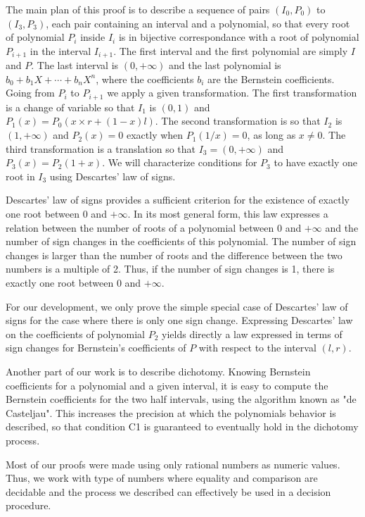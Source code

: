 \documentclass{mscs}
\begin{document}
The main plan of this proof is to describe a sequence of pairs
\((I_0, P_0)\) to \((I_3, P_3)\), each pair containing an interval
and a polynomial, so that every root of polynomial \(P_i\) inside
\(I_i\) is in bijective correspondance with a root of polynomial \(P_{i+1}\)
in the interval \(I_{i+1}\).  The first interval and the first polynomial
are simply \(I\) and \(P\).  The last interval is \((0, +\infty)\) and
the last polynomial is \(b_0 + b_1 X + \cdots + b_n X^n\), where
the coefficients \(b_i\) are the Bernstein coefficients.  Going from
\(P_i\) to \(P_{i+1}\) we apply a given transformation.  The first 
transformation is a change of variable so that \(I_1\) is \((0,1)\) and
\(P_1(x) = P_0(x \times r + (1 - x) l)\).  The second transformation is so
that \(I_2\) is \((1,+\infty)\) and \(P_2(x) = 0\) exactly when
\(P_1(1/x) = 0\), as long as \(x\neq 0\).  The third transformation is a
translation so that \(I_3 = (0,+\infty)\) and \(P_3(x) = P_2(1+x)\).  
We will characterize conditions for \(P_3\) to have exactly one root in
\(I_3\) using Descartes' law of signs.

Descartes' law of signs provides a sufficient criterion for the
existence of exactly one root between 0 and \(+\infty\).  In its
most general form, this law
expresses a relation between the number of roots of a polynomial
between 0 and \(+\infty\) and the number of sign changes in the
coefficients of this polynomial.  The number of sign changes is larger
than the number of roots and the difference between the two numbers is
a multiple of 2.  Thus, if the number of sign changes is 1, there is
exactly one root between 0 and \(+\infty\).

For our development, we only prove the simple special case of
Descartes' law of signs for the case where there is only one sign
change.  Expressing Descartes' law on the coefficients of polynomial
\(P_2\) yields directly a law expressed in terms of sign changes for
Bernstein's coefficients of \(P\) with respect to the interval
\((l,r)\).

Another part of our work is to describe dichotomy.  Knowing Bernstein
coefficients for a polynomial and a given interval, it is easy to
compute the Bernstein coefficients for the two half intervals, using
the algorithm known as "de Casteljau".  This increases the precision
at which the polynomials behavior is described, so that condition C1
is guaranteed to eventually hold in the dichotomy process.

Most of our proofs were made using only rational numbers as numeric
values.  Thus, we work with type of numbers where equality and
comparison are decidable and the process we described can effectively
be used in a decision procedure.
\end{document}
